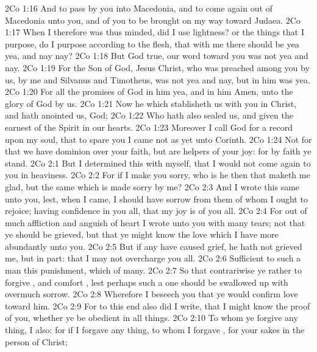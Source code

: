 \vs 2Co 1:16 And to pass by you into Macedonia, and to come again out of Macedonia unto you, and of you to be brought on my way toward Judaea.
\vs 2Co 1:17 When I therefore was thus minded, did I use lightness? or the things that I purpose, do I purpose according to the flesh, that with me there should be yea yea, and nay nay?
\vs 2Co 1:18 But  God  true, our word toward you was not yea and nay.
\vs 2Co 1:19 For the Son of God, Jesus Christ, who was preached among you by us,  by me and Silvanus and Timotheus, was not yea and nay, but in him was yea.
\vs 2Co 1:20 For all the promises of God in him  yea, and in him Amen, unto the glory of God by us.
\vs 2Co 1:21 Now he which stablisheth us with you in Christ, and hath anointed us,  God;
\vs 2Co 1:22 Who hath also sealed us, and given the earnest of the Spirit in our hearts.
\vs 2Co 1:23 Moreover I call God for a record upon my soul, that to spare you I came not as yet unto Corinth.
\vs 2Co 1:24 Not for that we have dominion over your faith, but are helpers of your joy: for by faith ye stand.
\vs 2Co 2:1 But I determined this with myself, that I would not come again to you in heaviness.
\vs 2Co 2:2 For if I make you sorry, who is he then that maketh me glad, but the same which is made sorry by me?
\vs 2Co 2:3 And I wrote this same unto you, lest, when I came, I should have sorrow from them of whom I ought to rejoice; having confidence in you all, that my joy is  of you all.
\vs 2Co 2:4 For out of much affliction and anguish of heart I wrote unto you with many tears; not that ye should be grieved, but that ye might know the love which I have more abundantly unto you.
\vs 2Co 2:5 But if any have caused grief, he hath not grieved me, but in part: that I may not overcharge you all.
\vs 2Co 2:6 Sufficient to such a man  this punishment, which  of many.
\vs 2Co 2:7 So that contrariwise ye  rather to forgive , and comfort , lest perhaps such a one should be swallowed up with overmuch sorrow.
\vs 2Co 2:8 Wherefore I beseech you that ye would confirm  love toward him.
\vs 2Co 2:9 For to this end also did I write, that I might know the proof of you, whether ye be obedient in all things.
\vs 2Co 2:10 To whom ye forgive any thing, I  also: for if I forgave any thing, to whom I forgave , for your sakes  in the person of Christ;
